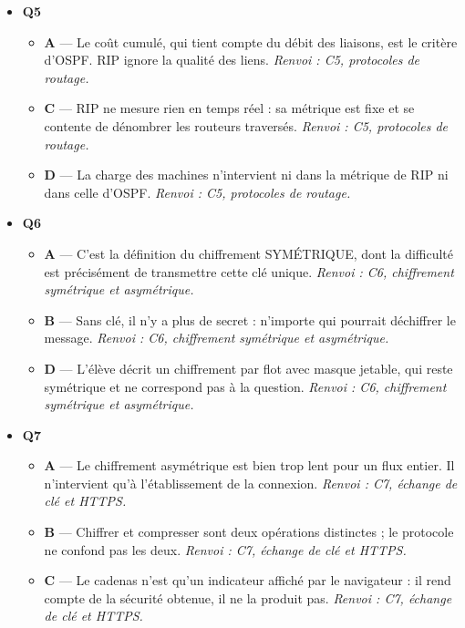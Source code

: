 \begin{itemize}
  \begin{itemize}
    \item \textbf{B} — Un arbre est par définition sans cycle : les attentes y remontent vers une racine et finissent donc par se résoudre. \emph{Renvoi : C4, interblocage.}
    \item \textbf{C} — Sans arête, aucun processus n'attend de ressource détenue par un autre. \emph{Renvoi : C4, interblocage.}
    \item \textbf{D} — Un sommet isolé désigne un processus qui n'attend rien : c'est exactement le contraire d'un blocage. \emph{Renvoi : C4, interblocage.}
  \end{itemize}
  \item \textbf{Q5}
  \begin{itemize}
    \item \textbf{A} — Le coût cumulé, qui tient compte du débit des liaisons, est le critère d'OSPF. RIP ignore la qualité des liens. \emph{Renvoi : C5, protocoles de routage.}
    \item \textbf{C} — RIP ne mesure rien en temps réel : sa métrique est fixe et se contente de dénombrer les routeurs traversés. \emph{Renvoi : C5, protocoles de routage.}
    \item \textbf{D} — La charge des machines n'intervient ni dans la métrique de RIP ni dans celle d'OSPF. \emph{Renvoi : C5, protocoles de routage.}
  \end{itemize}
  \item \textbf{Q6}
  \begin{itemize}
    \item \textbf{A} — C'est la définition du chiffrement SYMÉTRIQUE, dont la difficulté est précisément de transmettre cette clé unique. \emph{Renvoi : C6, chiffrement symétrique et asymétrique.}
    \item \textbf{B} — Sans clé, il n'y a plus de secret : n'importe qui pourrait déchiffrer le message. \emph{Renvoi : C6, chiffrement symétrique et asymétrique.}
    \item \textbf{D} — L'élève décrit un chiffrement par flot avec masque jetable, qui reste symétrique et ne correspond pas à la question. \emph{Renvoi : C6, chiffrement symétrique et asymétrique.}
  \end{itemize}
  \item \textbf{Q7}
  \begin{itemize}
    \item \textbf{A} — Le chiffrement asymétrique est bien trop lent pour un flux entier. Il n'intervient qu'à l'établissement de la connexion. \emph{Renvoi : C7, échange de clé et HTTPS.}
    \item \textbf{B} — Chiffrer et compresser sont deux opérations distinctes ; le protocole ne confond pas les deux. \emph{Renvoi : C7, échange de clé et HTTPS.}
    \item \textbf{C} — Le cadenas n'est qu'un indicateur affiché par le navigateur : il rend compte de la sécurité obtenue, il ne la produit pas. \emph{Renvoi : C7, échange de clé et HTTPS.}
  \end{itemize}
\end{itemize}
\fi
